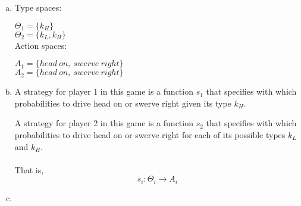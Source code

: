 \documentclass[a4paper]{article}
\begin{document}
\begin{enumerate}[(a)]
\item
Type spaces:

$\Theta_1=\{k_H\}$\\
$\Theta_2=\{k_L,k_H\}$\\

Action spaces:

$A_1=\{head\ on,\ swerve\ right\}$\\
$A_2=\{head\ on,\ swerve\ right\}$

\item
A strategy for player 1 in this game is a function $s_1$ that specifies with which probabilities to drive head on or swerve right given its type $k_H$.

A strategy for player 2 in this game is a function $s_2$ that specifies with which probabilities to drive head on or swerve right for each of its possible types $k_L$ and $k_H$.
\\ \\
That is, $$s_i:\Theta_i\rightarrow A_i$$

\item

\end{enumerate}
\end{document}
